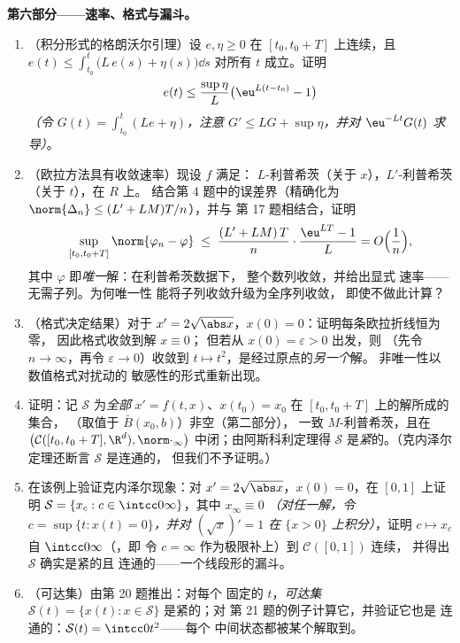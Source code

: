 \begin{problem}[{周末问题——无利普希茨条件时
$x' = f(t, x)$ 解的存在性}]
\medskip
\noindent\textbf{第六部分——速率、格式与漏斗。}
\begin{enumerate}[resume]
  \item （积分形式的格朗沃尔引理）设 $e, \eta \geq 0$ 在
        $[t_0, t_0+T]$ 上连续，且 $e(t) \leq \int_{t_0}
        ^t\bigl(L\,e(s) + \eta(s)\bigr)\dd s$ 对所有 $t$ 成立。证明
        \[
        e(t) \leq \frac{\sup\eta}{L}\bigl(\eu^{L(t - t_0)} -
        1\bigr)
        \]
        \emph{（令 $G(t) = \int_{t_0}^t(Le + \eta)$，注意 $G'
        \leq LG + \sup\eta$，并对
        $\eu^{-Lt}G(t)$ 求导）}。
  \item （欧拉方法具有收敛速率）现设 $f$ 满足：
        $L$-利普希茨（关于 $x$），$L'$-利普希茨（关于 $t$），在 $R$ 上。
        结合第 4 题中的误差界（精确化为
        $\norm{\Delta_n} \leq (L' + LM)T/n$），并与
        第 17 题相结合，证明
        \[
        \sup_{[t_0, t_0+T]}\norm{\varphi_n - \varphi}
        \;\leq\; \frac{(L' + LM)\,T}{n}\cdot
        \frac{\eu^{LT} - 1}{L} = O\Bigl(\frac1n\Bigr),
        \]
        其中 $\varphi$ 即\emph{唯一}解：在利普希茨数据下，
        整个数列收敛，并给出显式
        速率——无需子列。为何唯一性
        能将子列收敛升级为全序列收敛，
        即使不做此计算？
  \item （格式决定结果）对于 $x' = 2\sqrt{\abs x}$，$x(0) =
        0$：证明每条欧拉折线恒为零，
        因此格式收敛到解 $x \equiv 0$；
        但若从 $x(0) = \varepsilon > 0$ 出发，则
        （先令 $n \to \infty$，再令 $\varepsilon \to 0$）收敛到 $t
        \mapsto t^2$，是经过原点的\emph{另一个}解。
        非唯一性以数值格式对扰动的
        敏感性的形式重新出现。
  \item 证明：记 $\mathcal S$ 为\emph{全部}
        $x' = f(t,x)$、$x(t_0) = x_0$ 在 $[t_0, t_0+T]$ 上的解所成的集合，
        （取值于 $\bar B(x_0, b)$）非空（第二部分），
        一致 $M$-利普希茨，且在
        $\bigl(\mathcal C([t_0, t_0+T], \R^d),
        \norm\cdot_\infty\bigr)$ 中闭；由阿斯科利定理得
        $\mathcal S$ 是\emph{紧}的。（克内泽尔定理还断言
        $\mathcal S$ 是连通的，
        但我们不予证明。）
  \item 在该例上验证克内泽尔现象：对 $x' =
        2\sqrt{\abs x}$，$x(0) = 0$，在 $[0, 1]$ 上证明
        $\mathcal S = \{x_c : c \in \intcc0\infty\}$，其中
        $x_\infty \equiv 0$ \emph{（对任一解，令 $c =
        \sup\{t : x(t) = 0\}$，并对 $(\sqrt x)' = 1$ 在
        $\{x > 0\}$ 上积分）}，证明 $c \mapsto x_c$ 自
        $\intcc0\infty$（，即
        令 $c = \infty$ 作为极限补上）到 $\mathcal C([0,1])$ 连续，
        并得出 $\mathcal S$ 确实是紧的且
        连通的——一个线段形的漏斗。
  \item （可达集）由第 20 题推出：对每个
        固定的 $t$，\emph{可达集} $\mathcal S(t) =
        \{x(t) : x \in \mathcal S\}$ 是紧的；对
        第 21 题的例子计算它，并验证它也是
        连通的：$\mathcal S(t) = \intcc0{t^2}$——每个
        中间状态都被某个解取到。
\end{enumerate}


\end{problem}
